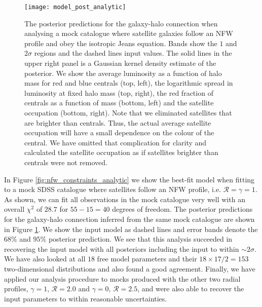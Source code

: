 \documentclass[fleqn,usenatbib,useAMS]{mnras}
\begin{document}
	\begin{figure}
		\centering
		\texttt{[image: model\_post\_analytic]}
		\caption{The posterior predictions for the galaxy-halo connection when analysing a mock catalogue where satellite galaxies follow an NFW profile and obey the isotropic Jeans equation. Bands show the $1$ and $2\sigma$ regions and the dashed lines input values. The solid lines in the upper right panel is a Gaussian kernel density estimate of the posterior. We show the average luminosity as a function of halo mass for red and blue centrals (top, left), the logarithmic spread in luminosity at fixed halo mass (top, right), the red fraction of centrals as a function of mass (bottom, left) and the satellite occupation (bottom, right). Note that we eliminated satellites that are brighter than centrals. Thus, the actual average satellite occupation will have a small dependence on the colour of the central. We have omitted that complication for clarity and calculated the satellite occupation as if satellites brighter than centrals were not removed.}
		\label{fig:model_post_nfw}
	\end{figure}
	
	In Figure \ref{fig:nfw_constraints_analytic} we show the best-fit model when fitting to a mock SDSS catalogue where satellites follow an NFW profile, i.e. $\mathcal{R} = \gamma = 1$. As shown, we can fit all observations in the mock catalogue very well with an overall $\chi^2$ of $28.7$ for $55 - 15 = 40$ degrees of freedom. The posterior predictions for the galaxy-halo connection inferred from the same mock catalogue are shown in Figure \ref{fig:model_post_nfw}. We show the input model as dashed lines and error bands denote the $68\%$ and $95\%$ posterior prediction. We see that this analysis succeeded in recovering the input model with all posteriors including the input to within $\sim 2 \sigma$. We have also looked at all $18$ free model parameters and their $18 \times 17 / 2 = 153$ two-dimensional distributions and also found a good agreement. Finally, we have applied our analysis procedure to mocks produced with the other two radial profiles, $\gamma = 1$, $\mathcal{R} = 2.0$ and $\gamma = 0$, $\mathcal{R} = 2.5$, and were also able to recover the input parameters to within reasonable uncertainties.
	
\end{document}
